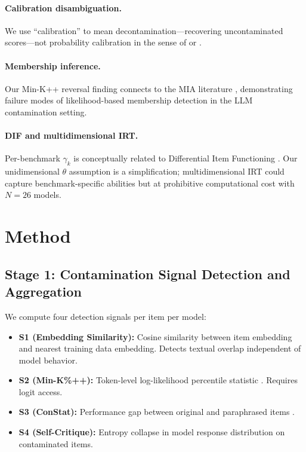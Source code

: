 \documentclass[11pt,a4paper]{article}
\begin{document}
\paragraph{Calibration disambiguation.}
We use ``calibration'' to mean decontamination---recovering uncontaminated scores---not probability calibration in the sense of \citet{guo2017calibration} or \citet{platt1999probabilistic}.

\paragraph{Membership inference.}
Our Min-K++ reversal finding connects to the MIA literature \citep{shokri2017membership, carlini2022quantifying}, demonstrating failure modes of likelihood-based membership detection in the LLM contamination setting.

\paragraph{DIF and multidimensional IRT.}
Per-benchmark $\gamma_k$ is conceptually related to Differential Item Functioning \citep{holland1993differential, thissen1993detection, zumbo1999handbook}.
Our unidimensional $\theta$ assumption is a simplification; multidimensional IRT \citep{reckase2009multidimensional, burnell2023revealing} could capture benchmark-specific abilities but at prohibitive computational cost with $N=26$ models.

\section{Method}

\subsection{Stage 1: Contamination Signal Detection and Aggregation}

We compute four detection signals per item per model:

\begin{itemize}
    \item \textbf{S1 (Embedding Similarity):} Cosine similarity between item embedding and nearest training data embedding. Detects textual overlap independent of model behavior.
    \item \textbf{S2 (Min-K\%++):} Token-level log-likelihood percentile statistic \citep{shi2024detecting}. Requires logit access.
    \item \textbf{S3 (ConStat):} Performance gap between original and paraphrased items \citep{dekoninck2024constat}.
    \item \textbf{S4 (Self-Critique):} Entropy collapse in model response distribution on contaminated items.
\end{itemize}
\end{document}
